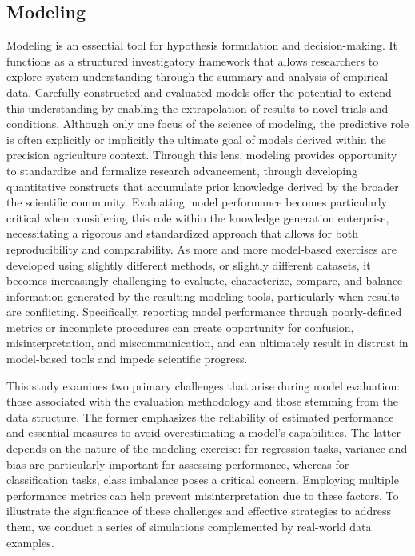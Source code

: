\subsection{Modeling}

Modeling is an essential tool for hypothesis formulation and decision-making. It functions as a structured investigatory framework that allows researchers to explore system understanding through the summary and analysis of empirical data. Carefully constructed and evaluated models offer the potential to extend this understanding by enabling the extrapolation of results to novel trials and conditions. Although only one focus of the science of modeling, the predictive role is often explicitly or implicitly the ultimate goal of models derived within the precision agriculture context. Through this lens, modeling provides opportunity to standardize and formalize research advancement, through developing quantitative constructs that accumulate prior knowledge derived by the broader the scientific community. Evaluating model performance becomes particularly critical when considering this role within the knowledge generation enterprise, necessitating a rigorous and standardized approach that allows for both reproducibility and comparability. As more and more model-based exercises are developed using slightly different methods, or slightly different datasets, it becomes increasingly challenging to evaluate, characterize, compare, and balance information generated by the resulting modeling tools, particularly when results are conflicting. Specifically, reporting model performance through poorly-defined metrics or incomplete procedures can create opportunity for confusion, misinterpretation, and miscommunication, and can ultimately result in distrust in model-based tools and impede scientific progress.

This study examines two primary challenges that arise during model evaluation: those associated with the evaluation methodology and those stemming from the data structure. The former emphasizes the reliability of estimated performance and essential measures to avoid overestimating a model’s capabilities. The latter depends on the nature of the modeling exercise: for regression tasks, variance and bias are particularly important for assessing performance, whereas for classification tasks, class imbalance poses a critical concern. Employing multiple performance metrics can help prevent misinterpretation due to these factors. To illustrate the significance of these challenges and effective strategies to address them, we conduct a series of simulations complemented by real-world data examples.

